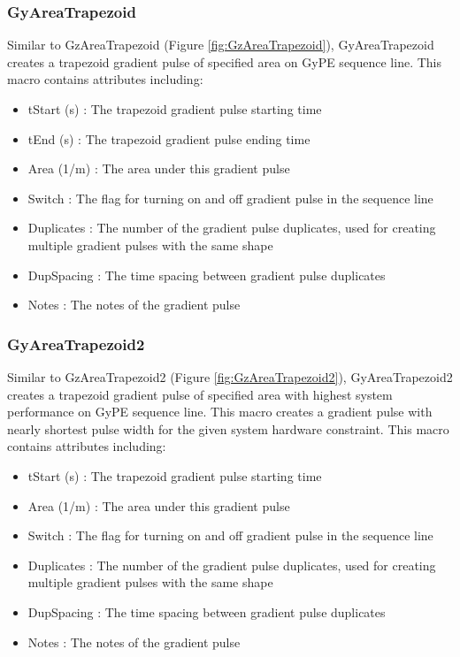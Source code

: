 \documentclass{book}%
\begin{document}
\subsubsection{GyAreaTrapezoid}

Similar to GzAreaTrapezoid (Figure \ref{fig:GzAreaTrapezoid}), GyAreaTrapezoid creates a trapezoid gradient pulse of specified area on GyPE sequence line. This macro contains attributes including:

\begin{itemize}
	\item tStart (s) : The trapezoid gradient pulse starting time
	\item tEnd (s) : The trapezoid gradient pulse ending time
	\item Area (1/m) : The area under this gradient pulse
	\item Switch : The flag for turning on and off gradient pulse in the sequence line
	\item Duplicates : The number of the gradient pulse duplicates, used for creating multiple gradient pulses with the same shape
	\item DupSpacing : The time spacing between gradient pulse duplicates
	\item Notes : The notes of the gradient pulse 
\end{itemize}


\subsubsection{GyAreaTrapezoid2}

Similar to GzAreaTrapezoid2 (Figure \ref{fig:GzAreaTrapezoid2}), GyAreaTrapezoid2 creates a trapezoid gradient pulse of specified area with highest system performance on GyPE sequence line. This macro creates a gradient pulse with nearly shortest pulse width for the given system hardware constraint. This macro contains attributes including:

\begin{itemize}
	\item tStart (s) : The trapezoid gradient pulse starting time
	\item Area (1/m) : The area under this gradient pulse
	\item Switch : The flag for turning on and off gradient pulse in the sequence line
	\item Duplicates : The number of the gradient pulse duplicates, used for creating multiple gradient pulses with the same shape
	\item DupSpacing : The time spacing between gradient pulse duplicates
	\item Notes : The notes of the gradient pulse 
\end{itemize}
\end{document}

